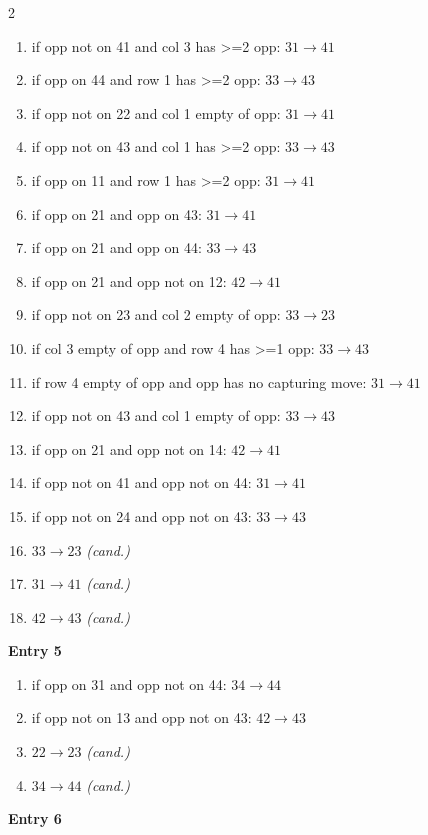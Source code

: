 \begin{multicols}{2}
\begin{tikzpicture}[scale=0.24]
\end{tikzpicture}
\nopagebreak\begin{enumerate}[topsep=1pt,itemsep=0pt,parsep=0pt,leftmargin=2.2em,label=\arabic*.]
\item if opp not on 41 and col 3 has >=2 opp: $31\!\to\!41$
\item if opp on 44 and row 1 has >=2 opp: $33\!\to\!43$
\item if opp not on 22 and col 1 empty of opp: $31\!\to\!41$
\item if opp not on 43 and col 1 has >=2 opp: $33\!\to\!43$
\item if opp on 11 and row 1 has >=2 opp: $31\!\to\!41$
\item if opp on 21 and opp on 43: $31\!\to\!41$
\item if opp on 21 and opp on 44: $33\!\to\!43$
\item if opp on 21 and opp not on 12: $42\!\to\!41$
\item if opp not on 23 and col 2 empty of opp: $33\!\to\!23$
\item if col 3 empty of opp and row 4 has >=1 opp: $33\!\to\!43$
\item if row 4 empty of opp and opp has no capturing move: $31\!\to\!41$
\item if opp not on 43 and col 1 empty of opp: $33\!\to\!43$
\item if opp on 21 and opp not on 14: $42\!\to\!41$
\item if opp not on 41 and opp not on 44: $31\!\to\!41$
\item if opp not on 24 and opp not on 43: $33\!\to\!43$
\item $33\!\to\!23$ \hfill\textit{(cand.)}
\item $31\!\to\!41$ \hfill\textit{(cand.)}
\item $42\!\to\!43$ \hfill\textit{(cand.)}
\end{enumerate}\smallskip
\noindent\textbf{Entry 5} \; 
\nopagebreak\begin{enumerate}[topsep=1pt,itemsep=0pt,parsep=0pt,leftmargin=2.2em,label=\arabic*.]
\item if opp on 31 and opp not on 44: $34\!\to\!44$
\item if opp not on 13 and opp not on 43: $42\!\to\!43$
\item $22\!\to\!23$ \hfill\textit{(cand.)}
\item $34\!\to\!44$ \hfill\textit{(cand.)}
\end{enumerate}\smallskip
\noindent\textbf{Entry 6} \; 
\end{multicols}
